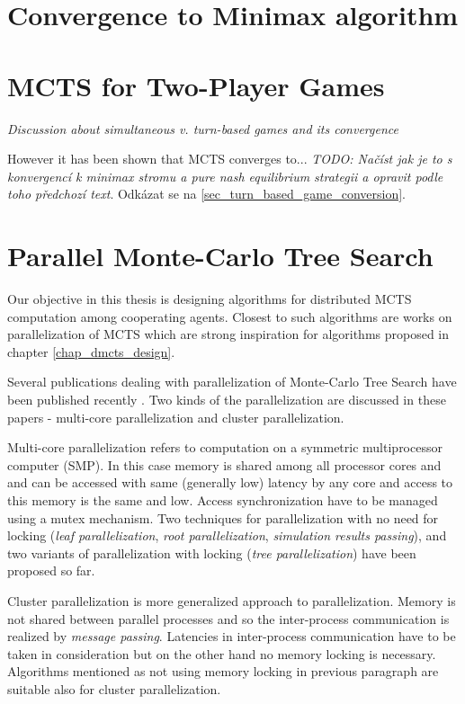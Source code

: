 \section{Convergence to Minimax algorithm}
\label{sec_minimax_convergence}



\section{MCTS for Two-Player Games}
\emph{Discussion about simultaneous v. turn-based games and its convergence}

However it has been shown that MCTS converges to... \emph{TODO: Načíst jak je to s konvergencí k
minimax stromu a pure nash equilibrium strategii a opravit podle toho předchozí text}. Odkázat se
na \ref{sec_turn_based_game_conversion}.


\section{Parallel Monte-Carlo Tree Search}
\label{sec_parallel_mcts}


Our objective in this thesis is designing algorithms for distributed MCTS computation among
cooperating agents. Closest to such algorithms are works on parallelization of MCTS which are
strong inspiration for algorithms proposed in chapter \ref{chap_dmcts_design}.

Several publications dealing with parallelization of Monte-Carlo Tree Search have been published
recently \cites{Cazenave2007}{Chaslot2008}{Teytaud2008}. Two kinds of the parallelization are
discussed in these papers - multi-core parallelization and cluster parallelization.

Multi-core parallelization refers to computation on a symmetric multiprocessor computer (SMP). In
this case memory is shared among all processor cores and and can be accessed with same
(generally low) latency by any core  and access to this memory is the same and low.
Access synchronization have to be managed using a mutex mechanism. Two techniques for
parallelization with no need for locking (\emph{leaf parallelization}, \emph{root parallelization},
\emph{simulation results passing}),
and two variants of parallelization with locking (\emph{tree parallelization}) have been proposed so
far. 

Cluster parallelization is more generalized approach to parallelization. Memory is not shared
between parallel processes and so the inter-process communication is realized by \emph{message
passing}. Latencies in inter-process communication have to be taken in consideration but on the
other hand no memory locking is necessary. Algorithms mentioned as not using memory locking in
previous paragraph are suitable also for cluster parallelization.

